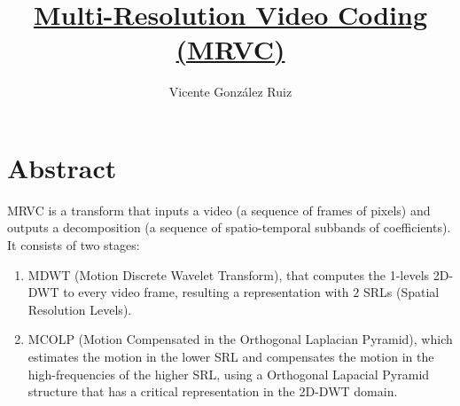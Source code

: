 

\title{\href{https://github.com/Sistemas-Multimedia/PRMC}{Multi-Resolution Video Coding (MRVC)}}

\author{Vicente González Ruiz}


\maketitle

\tableofcontents

\section*{Abstract}

MRVC is a transform that inputs a video (a sequence of frames of
pixels) and outputs a decomposition (a sequence of spatio-temporal
subbands of coefficients). It consists of two stages:

\begin{enumerate}
\item MDWT (Motion Discrete Wavelet Transform), that computes the
  1-levels 2D-DWT to every video frame, resulting a representation
  with $2$ SRLs (Spatial Resolution Levels).
\item MCOLP (Motion Compensated in the Orthogonal Laplacian Pyramid),
  which estimates the motion in the lower SRL and compensates the
  motion in the high-frequencies of the higher SRL, using a Orthogonal
  Lapacial Pyramid structure that has a critical representation in the
  2D-DWT domain.
\end{enumerate}

